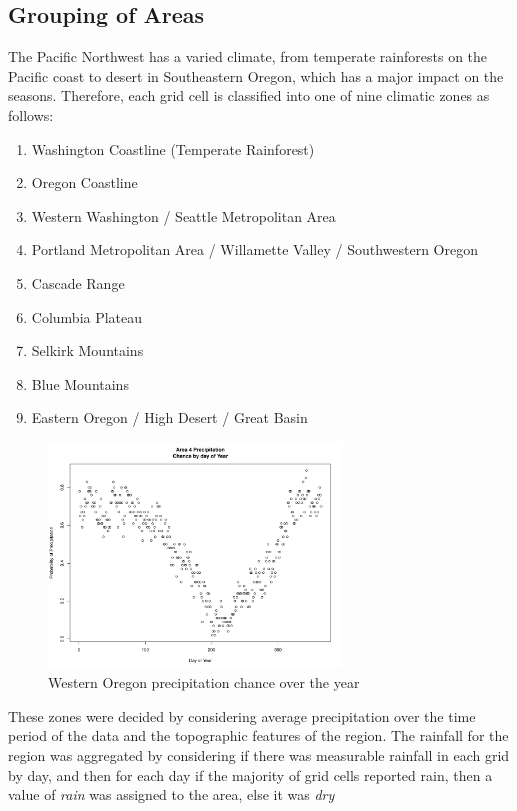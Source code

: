 \documentclass{article}
\begin{document}
\subsection{Grouping of Areas} \label{GroupArea}
The Pacific Northwest has a varied climate, from temperate rainforests on the Pacific coast to desert in Southeastern Oregon, which has a major impact on the seasons. Therefore, each grid cell is classified into one of nine climatic zones as follows:
\begin{enumerate}
\item Washington Coastline (Temperate Rainforest)
\item Oregon Coastline
\item Western Washington / Seattle Metropolitan Area
\item Portland Metropolitan Area / Willamette Valley / Southwestern Oregon
\item Cascade Range
\item Columbia Plateau
\item Selkirk Mountains
\item Blue Mountains
\item Eastern Oregon / High Desert / Great Basin
\end{enumerate}
\begin{figure}[h!]
\centering
\includegraphics[width = .4\textwidth, height = 6cm]{Area4PrecipByDay}
\caption{Western Oregon precipitation chance over the year}
\label{fig:area4}
\end{figure}
These zones were decided by considering average precipitation over the time period of the data and the topographic features of the region. The rainfall for the region was aggregated by considering if there was measurable rainfall in each grid by day, and then for each day if the majority of grid cells reported rain, then a value of \textit{rain} was assigned to the area, else it was \textit{dry}
\end{document}
